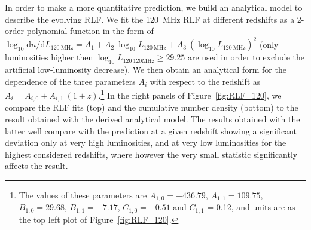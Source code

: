 \documentclass[traditabstract]{aa}
\newcommand{\rmn}{\mathrm}
\begin{document}
In order to make a more quantitative prediction, we build an analytical model to describe the evolving RLF. We fit the 120~MHz RLF at different redshifts as a 2-order polynomial function in the form of $\log_{10} \rmn{d}n/\rmn{d}L_{120~\rmn{MHz}} = A_{1} + A_{2}~\log_{10} L_{120~\rmn{MHz}} + A_{3}~(\log_{10} L_{120~\rmn{MHz}})^{2}$ (only luminosities higher then $\log_{10} L_{120~\rmn{120MHz}} \geq 29.25$ are used in order to exclude the artificial low-luminosity decrease). We then obtain an analytical form for the dependence of the three parameters $A_{i}$ with respect to the redshift as $A_{i} = A_{i,0} + A_{i,1}~(1+z)$.\footnote[15]{The values of these parameters are $A_{1,0} = -436.79$, $A_{1,1} = 109.75$, $B_{1,0} = 29.68$, $B_{1,1} = -7.17$, $C_{1,0} = -0.51$ and $C_{1,1}$ = 0.12, and units are as the top left plot of Figure~\ref{fig:RLF_120}.} In the right panels of Figure~\ref{fig:RLF_120}, we compare the RLF fits (top) and the cumulative number density (bottom) to the result obtained with the derived analytical model. The results obtained with the latter well compare with the prediction at a given redshift showing a significant deviation only at very high luminosities, and at very low luminosities for the highest considered redshifts, where however the very small statistic significantly affects the result. 
\end{document}
